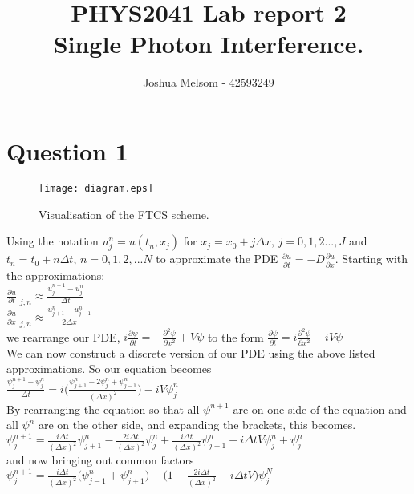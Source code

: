 \documentclass[11pt]{article} %
\title{PHYS2041 Lab report 2\\ Single Photon Interference.}
\author{Joshua Melsom - 42593249}
\date{}
\begin{document}
\section{Question 1}
\begin{figure}[!h]
\centering
\texttt{[image: diagram.eps]}
\caption{Visualisation of the FTCS scheme.}
\label{fig:appi}
\end{figure}


Using the notation $u^n _j = u(t_n, x_j)$ for $x_j = x_0 + j\Delta x, \, j=0,1,2...,J$ and $t_n = t_0 + n\Delta t, \, n=0,1,2,...N$ to approximate the PDE $\frac{\partial u}{\partial t} = -D\frac{\partial u}{\partial x}$. Starting with the approximations: \\


$\displaystyle{\frac{\partial u}{\partial t}  \bigg|_{j,n} \approx \frac{u^{n+1}_j - u^n _j}{\Delta t}}$\\ [0.5em]

$\displaystyle{\frac{\partial u}{\partial x} \bigg| _{j,n} \approx \frac{u^n_{j+1} - u^n_{j-1}}{2\Delta x}}$\\[0.5em]

we rearrange our PDE, $i\frac{\partial \psi}{\partial t} = -\frac{\partial ^2 \psi}{\partial x^2} + V\psi $ to the form $\frac{\partial \psi}{\partial t} = i\frac{\partial ^2 \psi}{\partial x^2} -iV\psi $\\

We can now construct a discrete version of our PDE using the above listed approximations. So our equation becomes \\

\noindent $\frac{\psi ^{n+1} _j - \psi^n _j}{\Delta t} = i \bigg ( \frac{\psi ^n _{j+1} - 2\psi^n _j + \psi ^n _{j-1}}{(\Delta x)^2} \bigg ) - iV\psi^n _j$\\

By rearranging the equation so that all $\psi ^{n+1}$ are on one side of the equation and all $\psi ^n$ are on the other side, and expanding the brackets, this becomes. \\

\noindent $\psi ^{n+1} _j= \frac{i \Delta t}{(\Delta x)^2} \psi ^n _{j+1} - \frac{2i \Delta t}{(\Delta x)^2}\psi ^n _j + \frac{i \Delta t}{(\Delta x)^2} \psi ^n _{j-1} - i \Delta t V \psi ^n _j + \psi ^n _j$\\

and now bringing out common factors\\

\noindent $\psi ^{n+1} _j = \frac{i \Delta t}{(\Delta x)^2} \big ( \psi ^n _{j-1} + \psi ^n _{j+1} \big ) + \big ( 1 - \frac{2i \Delta t}{(\Delta x)^2} - i \Delta t V \big ) \psi ^N _j$\\
\end{document}
